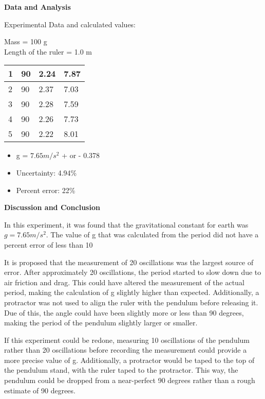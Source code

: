 \textbf{Data and Analysis}

Experimental Data and calculated values:

Mass = 100 g
\\ Length of the ruler = 1.0 m

\begin{table}
\begin{tabular}{|l|l|l|l|}
\hline
1 & 90 & 2.24 & 7.87 \\ \hline
2 & 90 & 2.37 & 7.03 \\ \hline
3 & 90 & 2.28 & 7.59 \\ \hline
4 & 90 & 2.26 & 7.73 \\ \hline
5 & 90 & 2.22 & 8.01 \\ \hline
\end{tabular}
\end{table}

\begin{itemize}
\item g = $7.65 m/s^2$ + or - 0.378
\item Uncertainty: 4.94\%
\item Percent error: 22\%
\end{itemize}

\textbf{Discussion and Conclusion}

In this experiment, it was found that the gravitational constant for earth was $g=7.65 m/s^2$. The value of g that was calculated from the period did not have a percent error of less than 10%

It is proposed that the measurement of 20 oscillations was the largest source of error. After approximately 20 oscillations, the period started to slow down due to air friction and drag. This could have altered the measurement of the actual period, making the calculation of g slightly higher than expected. Additionally, a protractor was not used to align the ruler with the pendulum before releasing it. Due of this, the angle could have been slightly more or less than 90 degrees, making the period of the pendulum slightly larger or smaller. 

If this experiment could be redone, measuring 10 oscillations of the pendulum rather than 20 oscillations before recording the measurement could provide a more precise value of g. Additionally, a protractor would be taped to the top of the pendulum stand, with the ruler taped to the protractor. This way, the pendulum could be dropped from a near-perfect 90 degrees rather than a rough estimate of 90 degrees. 

